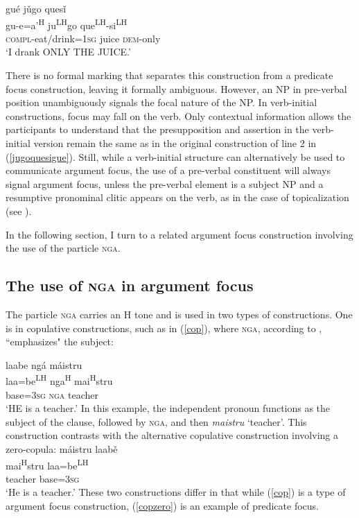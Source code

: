 \ea
\glll gu\'{e} j\v{u}go ques\v{i}  \\
gu-e=a'\textsuperscript{H} ju\textsuperscript{LH}go que\textsuperscript{LH}-si\textsuperscript{LH}  \\
\textsc{compl}-eat/drink=\textsc{1sg} juice \textsc{dem}-only  \\
\glt `I drank ONLY THE JUICE.'  

\z
There is no formal marking that separates this construction from a predicate focus construction, leaving it formally ambiguous. However, an NP in pre-verbal position unambiguously signals the focal nature of the NP. In verb-initial constructions, focus may fall on the verb. Only contextual information allows the participants to understand that the presupposition and assertion in the verb-initial version remain the same as in the original construction of line 2 in (\ref{jugoquesigue}). Still, while a verb-initial structure can alternatively be used to communicate argument focus, the use of a pre-verbal constituent will always signal argument focus, unless the pre-verbal element is a subject NP and a resumptive pronominal clitic appears on the verb, as in the case of topicalization (see ). 

In the following section, I turn to a related argument focus construction involving the use of the particle \textsc{nga}.

\subsection{The use of \textsc{nga} in argument focus}\label{ngaargfoc}

The particle \textsc{nga} carries an H tone and is used in two types of constructions. One is in copulative constructions, such as in (\ref{cop}), where \textsc{nga}, according to \citet[94]{pickett1998}, ``emphasizes" the subject:

\ea\label{cop}
\glll laabe ng\'{a} m\'{a}istru \\
laa=be\textsuperscript{LH} nga\textsuperscript{H} mai\textsuperscript{H}stru \\
base=3\textsc{sg} \textsc{nga} teacher \\
\glt `HE is a teacher.' \hfill \citep[94]{pickett1998}
\z
In this example, the independent pronoun functions as the subject of the clause, followed by \textsc{nga}, and then \textit{maistru} `teacher'. This construction contrasts with the alternative copulative construction involving a zero-copula:
\ea\label{copzero}
\glll m\'{a}istru laab\v{e} \\
mai\textsuperscript{H}stru laa=be\textsuperscript{LH} \\
teacher base=3\textsc{sg}  \\
\glt `He is a teacher.' 
\z
These two constructions differ in that while (\ref{cop}) is a type of argument focus construction, (\ref{copzero}) is an example of predicate focus. 

